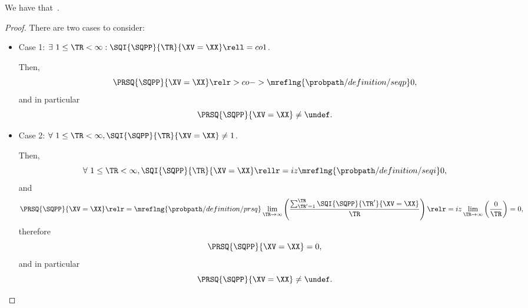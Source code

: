 \begin{proposition}
  We have that\ \sqpproblimdefprop.%
\end{proposition}

\begin{proof}
  There are two cases to consider:
  \begin{itemize}
    \item Case 1: $\exists\ 1 \le \TR < \infty : \SQI{\SQPP}{\TR}{\XV = \XX} \rell = co 1$.

      Then,
      $$\PRSQ{\SQPP}{\XV = \XX} \relr > co->\mreflng{\probpath/definition/seqp} 0,$$
      and in particular
      $$\PRSQ{\SQPP}{\XV = \XX} \ne \undef.$$

    \item Case 2: $\forall\ 1 \le \TR < \infty, \SQI{\SQPP}{\TR}{\XV= \XX} \ne 1$.

      Then,
      $$\forall\ 1 \le \TR < \infty, \SQI{\SQPP}{\TR}{\XV = \XX} \rellr = iz \mreflng{\probpath/definition/seqi} 0,$$
      and
      $$\PRSQ{\SQPP}{\XV = \XX} 
      \relr = \mreflng{\probpath/definition/prsq} \lim_{\TR \rightarrow \infty}\left(\frac{\sum_{\TR' = 1}^{\TR}\SQI{\SQPP}{\TR'}{\XV= \XX}}{\TR}\right)
      \relr = iz \lim_{\TR \rightarrow \infty}\left(\frac{0}{\TR}\right) = 0
      ,$$
      therefore
      $$\PRSQ{\SQPP}{\XV = \XX} = 0,$$
      and in particular
      $$\PRSQ{\SQPP}{\XV = \XX} \ne \undef.$$
  \end{itemize}
\end{proof}
